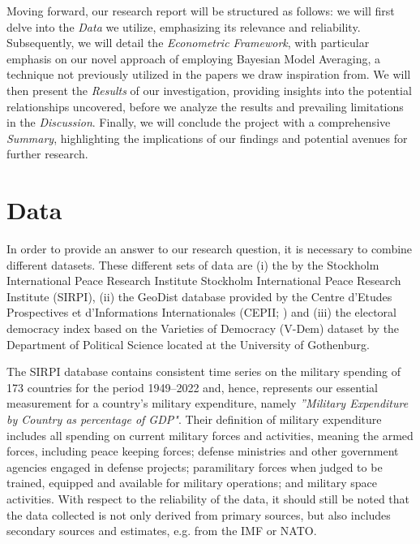 \documentclass[12pt,a4paper]{article}
\begin{document}
Moving forward, our research report will be structured as follows: we will first delve into the \textit{Data} we utilize, emphasizing its relevance and reliability. Subsequently, we will detail the \textit{Econometric Framework}, with particular emphasis on our novel approach of employing Bayesian Model Averaging, a technique not previously utilized in the papers we draw inspiration from. We will then present the \textit{Results} of our investigation, providing insights into the potential relationships uncovered, before we analyze the results and prevailing limitations in the \textit{Discussion}. Finally, we will conclude the project with a comprehensive \emph{Summary},
highlighting the implications of our findings and potential avenues for further research.

\section{Data}
In order to provide an answer to our research question, it is necessary to combine different datasets. These different sets of data are (i) the \citet{SIRPI} by the Stockholm International Peace Research Institute Stockholm International Peace Research Institute (SIRPI), (ii) the GeoDist database provided by the Centre d'Etudes Prospectives et d'Informations Internationales (CEPII; \citealp{mayer2011}) and (iii) the electoral democracy index based on the Varieties of Democracy (V-Dem) dataset \citep{VDEM} by the Department of Political Science located at the University of Gothenburg. 

The SIRPI database contains consistent time series on the military spending of 173  countries for the period 1949–2022 and, hence, represents our essential measurement for a country's military expenditure, namely \textit{''Military Expenditure by Country as percentage of GDP"}. Their definition of military expenditure includes all spending on current military forces and activities, meaning the armed forces, including peace keeping forces; defense ministries and other government agencies engaged in defense projects; paramilitary forces when judged to be trained, equipped and available for military operations; and military space activities. With respect to the reliability of the data, it should still be noted that the data collected is not only derived from primary sources, but also includes secondary sources and estimates, e.g. from the IMF or NATO.
 
\end{document}
